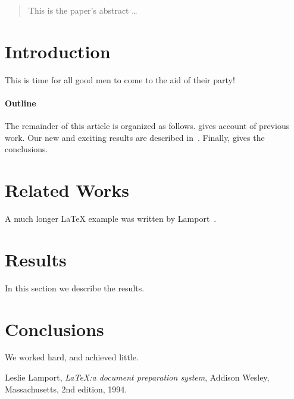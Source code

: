 \documentclass[12pt]{article}
\begin{document}
\maketitle

\begin{abstract}
This is the paper's abstract \ldots
\end{abstract}

\section{Introduction}\label{sec:introduction}
This is time for all good men to come to the aid of their party!

\paragraph{Outline}\label{par:outline}
The remainder of this article is organized as follows.
 gives account of previous work.
Our new and exciting results are described in~.
Finally,  gives the conclusions.

\section{Related Works}\label{sec:related_works}
A much longer \LaTeX{} example was written by Lamport~\cite{lamport94}.

\section{Results}\label{sec:results}
In this section we describe the results.

\section{Conclusions}\label{sec:conclusions}
We worked hard, and achieved little.

\begin{thebibliography}{9}

    Leslie Lamport,
    \emph{\LaTeX:\@ a document preparation system},
    Addison Wesley, Massachusetts,
    2nd edition,
    1994.

\end{thebibliography}

% 
% 
\end{document}
